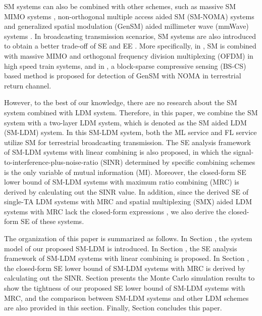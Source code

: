 \documentclass[journal]{IEEEtran}
\begin{document}
SM systems can also be combined with other schemes, such as massive SM MIMO systems \cite{Massive_SM_ITA} \cite{Massive_SM_TVT}, non-orthogonal multiple access aided SM (SM-NOMA) systems \cite{NOMA_SM_WXS} and generalized spatial modulation (GenSM) aided millimeter wave (mmWave) systems \cite{Mmwave_SM_HLZ} \cite{Mmwave_SM_HLZ_TCOM}. In broadcasting transmission scenarios, SM systems are also introduced to obtain a better trade-off of SE and EE \cite{SM_TBC}\cite{SM_Jiao}. More specifically, in \cite{SM_TBC}, SM is combined with massive MIMO and orthogonal frequency division multiplexing (OFDM) in high speed train systems, and in \cite{SM_Jiao}, a block-sparse compressive sensing (BS-CS) based method is proposed for detection of GenSM with NOMA in terrestrial return channel.

However, to the best of our knowledge, there are no research about the SM system combined with LDM system. Therefore, in this paper, we combine the SM system with a two-layer LDM system, which is denoted as the SM aided LDM (SM-LDM) system. In this SM-LDM system, both the ML service and FL service utilize SM for terrestrial broadcasting transmission. The SE analysis framework of SM-LDM systems with linear combining is also proposed, in which the signal-to-interference-plus-noise-ratio (SINR) determined by specific combining schemes is the only variable of mutual information (MI). Moreover, the closed-form SE lower bound of SM-LDM systems with maximum ratio combining (MRC) is derived by calculating out the SINR value. In addition, since the derived SE of single-TA LDM systems with MRC and spatial multiplexing (SMX) aided LDM systems with MRC lack the closed-form expressions \cite{LDM_TAP}\cite{LDM_MIMO_C}, we also derive the closed-form SE of these systems.

The organization of this paper is summarized as follows. In Section \uppercase\expandafter{}, the system model of our proposed SM-LDM is introduced. In Section \uppercase\expandafter{}, the SE analysis framework of SM-LDM systems with linear combining is proposed. In Section \uppercase\expandafter{}, the closed-form SE lower bound of SM-LDM systems with MRC is derived by calculating out the SINR. Section \uppercase\expandafter{} presents the Monte Carlo simulation results to show the tightness of our proposed SE lower bound of SM-LDM systems with MRC, and the comparison between SM-LDM systems and other LDM schemes are also provided in this section. Finally, Section \uppercase\expandafter{} concludes this paper.
\end{document}
